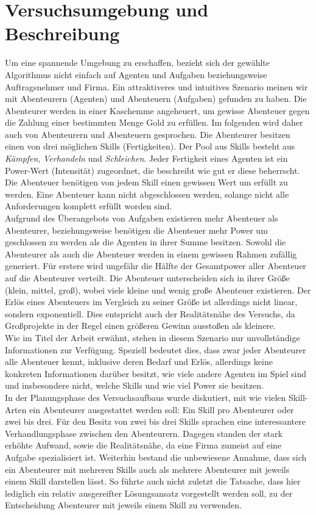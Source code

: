 \documentclass[fleqn,10pt]{SelfArx} %
\begin{document}

\section{Versuchsumgebung und Beschreibung}
\label{sec:Umgebung}

Um eine spannende Umgebung zu erschaffen, bezieht sich der gewählte Algorithmus nicht einfach auf Agenten und Aufgaben beziehungsweise Auftragsnehmer und Firma. Ein attraktiveres und intuitives Szenario meinen wir mit Abenteurern (Agenten) und Abenteuern (Aufgaben) gefunden zu haben. Die Abenteurer werden in einer Kaschemme angeheuert, um gewisse Abenteuer gegen die Zahlung einer bestimmten Menge Gold zu erfüllen. Im folgenden wird daher auch von Abenteurern und Abenteuern gesprochen. Die Abenteurer besitzen einen von drei möglichen Skills (Fertigkeiten). Der Pool aus Skills besteht aus \textit{Kämpfen}, \textit{Verhandeln} und \textit{Schleichen}. Jeder Fertigkeit eines Agenten ist ein Power-Wert (Intensität) zugeordnet, die beschreibt wie gut er diese beherrscht. Die Abenteuer benötigen von jedem Skill einen gewissen Wert um erfüllt zu werden. Eine Abenteuer kann nicht abgeschlossen werden, solange nicht alle Anforderungen komplett erfüllt worden sind.\\
Aufgrund des Überangebots von Aufgaben existieren mehr Abenteuer als Abenteurer, beziehungsweise benötigen die Abenteuer mehr Power um geschlossen zu werden als die Agenten in ihrer Summe besitzen. Sowohl die Abenteurer als auch die Abenteuer werden in einem gewissen Rahmen zufällig generiert. Für erstere wird ungefähr die Hälfte der Gesamtpower aller Abenteuer auf die Abenteurer verteilt. Die Abenteuer unterscheiden sich in ihrer Größe (klein, mittel, groß), wobei viele kleine und wenig große Abenteuer existieren. Der Erlös eines Abenteuers im Vergleich zu seiner Größe ist allerdings nicht linear, sondern exponentiell. Dies entspricht auch der Realitätsnähe des Versuchs, da Großprojekte in der Regel einen größeren Gewinn ausstoßen als kleinere.\\
Wie im Titel der Arbeit erwähnt, stehen in diesem Szenario nur unvollständige Informationen zur Verfügung. Speziell bedeutet dies, dass zwar jeder Abenteurer alle Abenteuer kennt, inklusive deren Bedarf und Erlös, allerdings keine konkreten Informationen darüber besitzt, wie viele andere Agenten im Spiel sind und insbesondere nicht, welche Skills und wie viel Power sie besitzen.\\ 
In der Planungsphase des Versuchsaufbaus wurde diskutiert, mit wie vielen Skill-Arten ein Abenteurer ausgestattet werden soll: Ein Skill pro Abenteurer oder zwei bis drei. Für den Besitz von zwei bis drei Skills sprachen eine interessantere Verhandlungsphase zwischen den Abenteurern. Dagegen standen der stark erhöhte Aufwand, sowie die Realitätsnähe, da eine Firma zumeist auf eine Aufgabe spezialisiert ist. Weiterhin bestand die unbewiesene Annahme, dass sich ein Abenteurer mit mehreren Skills auch als mehrere Abenteurer mit jeweils einem Skill darstellen lässt. So führte auch nicht zuletzt die Tatsache, dass hier lediglich ein relativ ausgereifter Lösungsansatz vorgestellt werden soll, zu der Entscheidung Abenteurer mit jeweils einem Skill zu verwenden. \\
\end{document}
